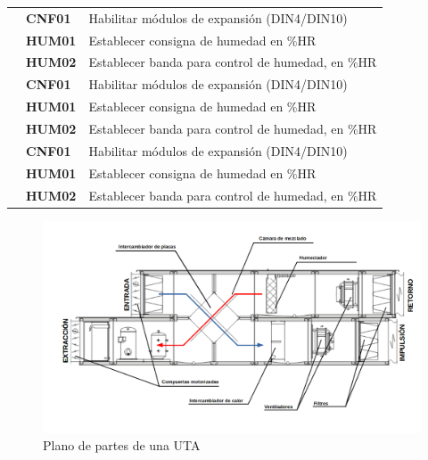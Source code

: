 \begin{center}
\begin{longtable}{|p{3cm}|p{4cm}|p{7.5cm}|}
        \centering{Salidas} & \small\centering\textbf{CNF01} & \small{Habilitar módulos de expansión (DIN4/DIN10)} \\ \cline{2-3}
        \centering{analógicas} & \small\centering\textbf{HUM01} & \small{Establecer consigna de humedad en \%HR} \\ \cline{2-3}
        & \small\centering\textbf{HUM02} & \small{Establecer banda para control de humedad, en \%HR} \\ \hline

        \centering{Alarmas} & \small\centering\textbf{CNF01} & \small{Habilitar módulos de expansión (DIN4/DIN10)} \\ \cline{2-3}
        & \small\centering\textbf{HUM01} & \small{Establecer consigna de humedad en \%HR} \\ \cline{2-3}
        & \small\centering\textbf{HUM02} & \small{Establecer banda para control de humedad, en \%HR} \\ \hline

        \centering{Warnings} & \small\centering\textbf{CNF01} & \small{Habilitar módulos de expansión (DIN4/DIN10)} \\ \cline{2-3}
        & \small\centering\textbf{HUM01} & \small{Establecer consigna de humedad en \%HR} \\ \cline{2-3}
        & \small\centering\textbf{HUM02} & \small{Establecer banda para control de humedad, en \%HR} \\ \hline
    \end{longtable}
\end{center}


\begin{figure}[H]
    \centering
    \includegraphics[width=\textwidth, keepaspectratio]{img/esquemaUTA}
    \caption{Plano de partes de una UTA}
    \label{figura:sasssssd}
\end{figure}
